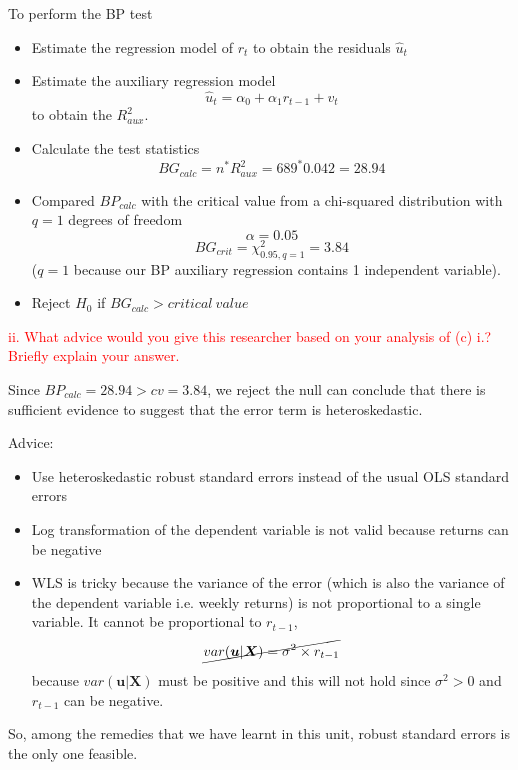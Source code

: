 \documentclass[12pt]{report}
\begin{document}
\noindent To perform the BP test \begin{itemize}
	\item Estimate the regression model of $r_t$ to obtain the residuals $\hat{u}_t$
	\item Estimate the auxiliary regression model $$\hat{u}_t = \alpha_0 + \alpha_1r_{t-1} + v_t$$ to obtain the $R^2_{aux}.$
	\item Calculate the test statistics $$BG_{calc} = n^*R^2_{aux} = 689^*0.042 = 28.94$$
	\item Compared $BP_{calc}$ with the critical value from a chi-squared distribution with $q=1$ degrees of freedom $$\alpha = 0.05$$ $$BG_{crit} = \chi^2_{0.95,q=1} = 3.84$$ ($q=1$ because our BP auxiliary regression contains 1 independent variable).
	\item Reject $H_0$ if $BG_{calc} > critical\ value$	
\end{itemize} 

\noindent \textcolor{red}{ii. What advice would you give this researcher based on your analysis of (c) i.? Briefly explain your answer.}

\noindent Since $BP_{calc} = 28.94 > cv = 3.84$, we reject the null can conclude that there is sufficient evidence to suggest that the error term is heteroskedastic.

\noindent Advice: \begin{itemize} \vspace{-\baselineskip}
	\item Use heteroskedastic robust standard errors instead of the usual OLS standard errors
	\item Log transformation of the dependent variable is not valid because returns can be negative
	\item WLS is tricky because the variance of the error (which is also the variance of the dependent variable i.e. weekly returns) is not proportional to a single variable. It cannot be proportional to $r_{t-1}$, $$\cancel{{var(\boldsymbol{u}|\boldsymbol{X}) = \sigma^2\times r_{t-1}}}$$ because $var(\boldsymbol{u}|\boldsymbol{X})$ must be positive and this will not hold since $\sigma^2 > 0$ and $r_{t-1}$ can be negative.
\end{itemize} \noindent So, among the remedies that we have learnt in this unit, robust standard errors is the only one feasible.
\end{document}
